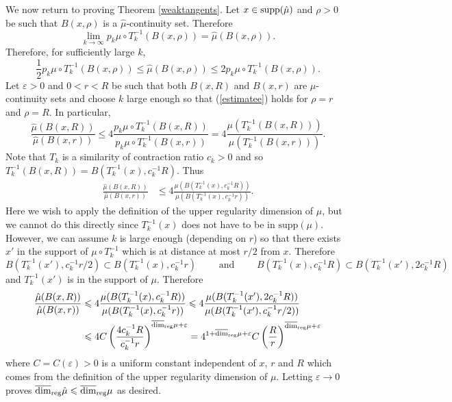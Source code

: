 \documentclass[12pt]{amsart}
\numberwithin{equation}{section}
\renewcommand{\le}{\leqslant}
\renewcommand{\r}{\overline{\dim}_{\textup{reg}} \mu}
\renewcommand{\epsilon}{\varepsilon}
\begin{document}
We now return to proving Theorem \ref{weaktangents}. Let  $x \in \textup{supp}( \hat \mu)$ and $\rho>0$ be such that $B(x,\rho)$ is a $\hat \mu$-continuity set.   Therefore 
\[
\lim_{k\rightarrow \infty} p_k \mu \circ T^{-1}_k (B(x,\rho)) =\hat{\mu}(B(x,\rho)).
\]
Therefore, for sufficiently large $k$, 
\begin{equation} \label{estimatee}
\frac{1}{2}p_k \mu \circ T^{-1}_k (B(x,\rho))  \le \hat{\mu}(B(x,\rho))\le 2p_k \mu \circ T^{-1}_k (B(x,\rho)).
\end{equation}
  Let $\varepsilon > 0 $ and  $0<r<R$ be such that both $B(x,R)$ and $B(x,r)$ are $\hat \mu$-continuity sets  and  choose $k $ large enough so that  (\ref{estimatee}) holds for $\rho=r$ and $\rho=R$.  In particular,  
\[
\frac{\hat{\mu}(B(x,R))}{\hat{\mu}(B(x,r))} \le 4 \frac{p_k\mu \circ T^{-1}_k (B(x,R))}{p_k \mu \circ T^{-1}_k (B(x,r))}=4\frac{\mu (T^{-1}_k (B(x,R)))}{\mu( T^{-1}_k (B(x,r)))}.
\]
Note that $T_k$ is a similarity of contraction ratio $c_k >0$ and so $T_k^{-1}(B(x,R))= B(T_k^{-1}(x),c_k^{-1}R)$. Thus
\begin{align*}
\frac{\hat{\mu}(B(x,R))}{\hat{\mu}(B(x,r))} &\le 4\frac{\mu (B(T_k^{-1}(x),c_k^{-1}R))}{\mu (B(T_k^{-1}(x),c_k^{-1}r))}.
\end{align*}
Here we wish to apply the definition of the upper regularity dimension of $\mu$, but we cannot do this directly since  $T_k^{-1}(x)$ does not have to be in $\text{supp}(\mu)$. However, we can assume $k$ is large enough (depending on $r$) so that there exists $x'$ in the support of $\mu \circ T_k^{-1}$ which is at distance at most $r/2$ from $x$. Therefore
\[
B(T_k^{-1}(x'),c_k^{-1}r/2)\subset B(T_k^{-1}(x),c_k^{-1}r) \qquad \text{ and } \qquad   B(T_k^{-1}(x),c_k^{-1}R) \subset B(T_k^{-1}(x'), 2c_k^{-1}R)
\]
and $T_k^{-1}(x')$ is in the support of $\mu$.  Therefore
\begin{align*}
\frac{\hat{\mu}(B(x,R))}{\hat{\mu}(B(x,r))} &\le 4\frac{\mu (B(T_k^{-1}(x),c_k^{-1}R))}{\mu (B(T_k^{-1}(x),c_k^{-1}r))} \le 4\frac{\mu (B(T_k^{-1}(x'),2c_k^{-1}R))}{\mu (B(T_k^{-1}(x'),c_k^{-1}r/2))} \\
&\le 4C \left(\frac{4c_k^{-1}R}{c_k^{-1}r}\right)^{\r+ \varepsilon} =  4^{1+\r+ \varepsilon}C \left(\frac{R}{r}\right)^{\r+ \varepsilon}
\end{align*}
where $C= C(\varepsilon)>0$ is a uniform constant independent of $x$, $r$ and $R$ which comes from the definition of the upper regularity dimension of $\mu$. Letting $\epsilon \to 0$ proves  $\overline{\dim}_{\textup{reg}} \hat{\mu} \le \r$ as desired.
\end{document}
